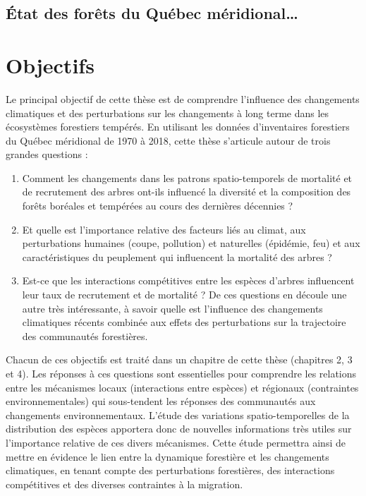 \hypertarget{uxe9tat-des-foruxeats-du-quuxe9bec-muxe9ridional}{%
\subsection{État des forêts du Québec
méridional\ldots{}}\label{uxe9tat-des-foruxeats-du-quuxe9bec-muxe9ridional}}

\hypertarget{objectifs}{%
\section{Objectifs}\label{objectifs}}

Le principal objectif de cette thèse est de comprendre l'influence des
changements climatiques et des perturbations sur les changements à long
terme dans les écosystèmes forestiers tempérés. En utilisant les données
d'inventaires forestiers du Québec méridional de 1970 à 2018, cette
thèse s'articule autour de trois grandes questions :

\begin{enumerate}
\def\labelenumi{(\arabic{enumi})}
\item
  Comment les changements dans les patrons spatio-temporels de mortalité
  et de recrutement des arbres ont-ils influencé la diversité et la
  composition des forêts boréales et tempérées au cours des dernières
  décennies ?
\item
  Et quelle est l'importance relative des facteurs liés au climat, aux
  perturbations humaines (coupe, pollution) et naturelles (épidémie,
  feu) et aux caractéristiques du peuplement qui influencent la
  mortalité des arbres ?
\item
  Est-ce que les interactions compétitives entre les espèces d'arbres
  influencent leur taux de recrutement et de mortalité ? De ces
  questions en découle une autre très intéressante, à savoir quelle est
  l'influence des changements climatiques récents combinée aux effets
  des perturbations sur la trajectoire des communautés forestières.
\end{enumerate}

Chacun de ces objectifs est traité dans un chapitre de cette thèse
(chapitres 2, 3 et 4). Les réponses à ces questions sont essentielles
pour comprendre les relations entre les mécanismes locaux (interactions
entre espèces) et régionaux (contraintes environnementales) qui
sous-tendent les réponses des communautés aux changements
environnementaux. L'étude des variations spatio-temporelles de la
distribution des espèces apportera donc de nouvelles informations très
utiles sur l'importance relative de ces divers mécanismes. Cette étude
permettra ainsi de mettre en évidence le lien entre la dynamique
forestière et les changements climatiques, en tenant compte des
perturbations forestières, des interactions compétitives et des diverses
contraintes à la migration.

